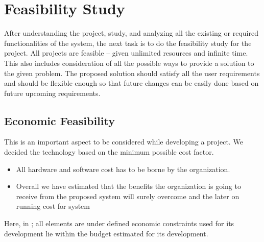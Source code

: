 \section{Feasibility Study}
		\vs
		\hspace{1cm} After understanding the project, study, and analyzing all the existing or required functionalities of the system, the next task is to do the feasibility study for the project. All projects are feasible – given unlimited resources and infinite time. This also includes consideration of all the possible ways to provide a solution to the given problem. The proposed solution should satisfy all the user requirements and should be flexible enough so that future changes can be easily done based on future upcoming requirements.
		\vs
		\subsection{Economic Feasibility}
		\vs
		\hspace{1cm}This is an important aspect to be considered while developing a project. We
		decided the technology based on the minimum possible cost factor.
		\begin{itemize}
			\item All hardware and software cost has to be borne by the organization.
			\item Overall we have estimated that the benefits the organization is going to
			receive from the proposed system will surely overcome and the later on
			running cost for system
		\end{itemize}
		Here, in \projectname; all elements are under defined economic constraints used for its development lie within the budget estimated for its development.
		\vs
